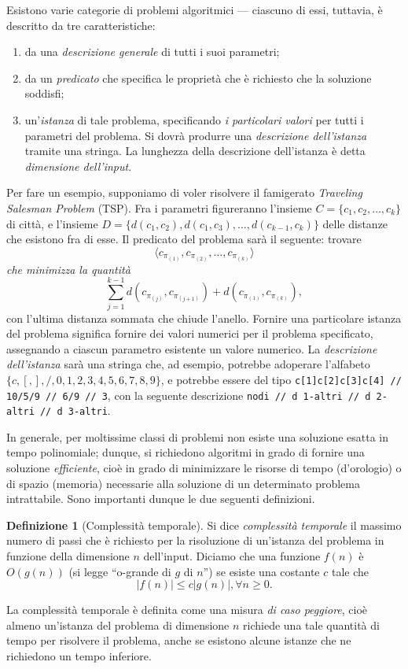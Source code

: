 \documentclass[10pt]{\classname}
\theoremstyle{newlinethm}
\theoremstyle{theorem}
\theoremstyle{definition}
\newtheorem{definizione}{Definizione}[section]
\theoremstyle{definition}
\theoremstyle{definition}
\theoremstyle{definition}
\begin{document}
Esistono varie categorie di problemi algoritmici --- ciascuno di essi, tuttavia, è descritto da tre caratteristiche:
\begin{enumerate}
    \item da una \emph{descrizione generale} di tutti i suoi parametri;
    \item da un \emph{predicato} che specifica le proprietà che è richiesto che la soluzione soddisfi;
    \item un'\emph{istanza} di tale problema, specificando \emph{i particolari valori} per tutti i parametri del problema. Si dovrà produrre una \emph{descrizione dell'istanza} tramite una stringa. La lunghezza della descrizione dell'istanza è detta \emph{dimensione dell'input}.
\end{enumerate}
Per fare un esempio, supponiamo di voler risolvere il famigerato \emph{Traveling Salesman Problem} (TSP). Fra i parametri figureranno l'insieme $C = \{c_1, c_2, \dots, c_k\}$ di città, e l'insieme $D=\{d(c_1,c_2), d(c_1,c_3),\dots,d(c_{k-1},c_k)\}$ delle distanze che esistono fra di esse. Il predicato del problema sarà il seguente: trovare \[\langle c_{\pi_{(1)}}, c_{\pi_{(2)}}, \dots, c_{\pi_{(k)}} \rangle\] \emph{che minimizza la quantità} \[\sum_{j=1}^{k-1} d(c_{\pi_{(j)}}, c_{\pi_{(j+1)}}) + d(c_{\pi_{(1)}},c_{\pi_{(k)}}),\] con l'ultima distanza sommata che chiude l'anello. Fornire una particolare istanza del problema significa fornire dei valori numerici per il problema specificato, assegnando a ciascun parametro esistente un valore numerico. La \emph{descrizione dell'istanza} sarà una stringa che, ad esempio, potrebbe adoperare l'alfabeto $\{c, [, ], /, 0,1,2,3,4,5,6,7,8,9\}$, e potrebbe essere del tipo \texttt{c[1]c[2]c[3]c[4] // 10/5/9 // 6/9 // 3}, con la seguente descrizione \texttt{nodi // d 1-altri // d 2-altri // d 3-altri}.

In generale, per moltissime classi di problemi non esiste una soluzione esatta in tempo polinomiale; dunque, si richiedono algoritmi in grado di fornire una soluzione \emph{efficiente}, cioè in grado di minimizzare le risorse di tempo (d'orologio) o di spazio (memoria) necessarie alla soluzione di un determinato problema intrattabile. Sono importanti dunque le due seguenti definizioni.

\begin{definizione}[Complessità temporale] Si dice \emph{complessità temporale} il massimo numero di passi che è richiesto per la risoluzione di un'istanza del problema in funzione della dimensione $n$ dell'input. Diciamo che una funzione $f(n)$ è $O(g(n))$ (si legge ``o-grande di $g$ di $n$'') se esiste una costante $c$ tale che \[|f(n)| \leq c|g(n)|, \forall n\geq0.\]

La complessità temporale è definita come una misura \emph{di caso peggiore}, cioè almeno un'istanza del problema di dimensione $n$ richiede una tale quantità di tempo per risolvere il problema, anche se esistono alcune istanze che ne richiedono un tempo inferiore.
\end{definizione}
\end{document}
